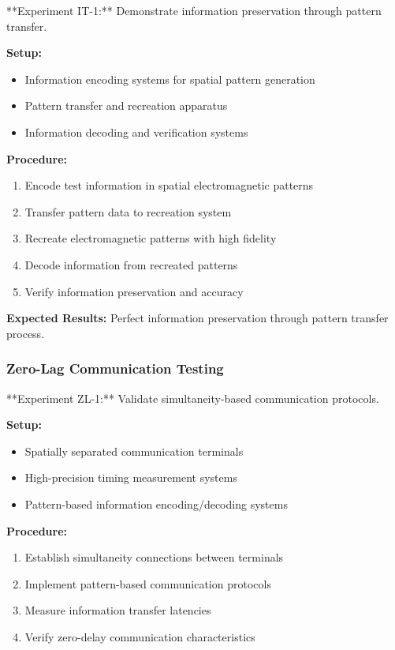 \documentclass[12pt,a4paper]{article}
\begin{document}
**Experiment IT-1:** Demonstrate information preservation through pattern transfer.

\textbf{Setup:}
\begin{itemize}
\item Information encoding systems for spatial pattern generation
\item Pattern transfer and recreation apparatus
\item Information decoding and verification systems
\end{itemize}

\textbf{Procedure:}
\begin{enumerate}
\item Encode test information in spatial electromagnetic patterns
\item Transfer pattern data to recreation system
\item Recreate electromagnetic patterns with high fidelity
\item Decode information from recreated patterns
\item Verify information preservation and accuracy
\end{enumerate}

\textbf{Expected Results:} Perfect information preservation through pattern transfer process.

\subsubsection{Zero-Lag Communication Testing}

**Experiment ZL-1:** Validate simultaneity-based communication protocols.

\textbf{Setup:}
\begin{itemize}
\item Spatially separated communication terminals
\item High-precision timing measurement systems
\item Pattern-based information encoding/decoding systems
\end{itemize}

\textbf{Procedure:}
\begin{enumerate}
\item Establish simultaneity connections between terminals
\item Implement pattern-based communication protocols
\item Measure information transfer latencies
\item Verify zero-delay communication characteristics
\end{enumerate}
\end{document}
